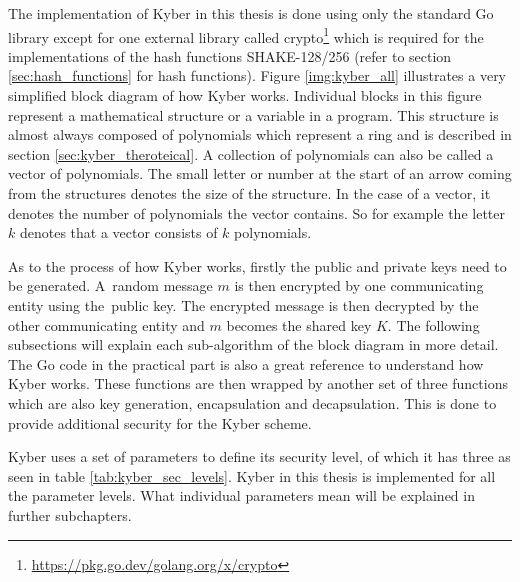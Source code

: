 The implementation of Kyber in this thesis is done using only the standard Go library except for one external library called crypto\footnote{\url{https://pkg.go.dev/golang.org/x/crypto}} which is required for the implementations of the hash functions SHAKE-128/256 (refer to section \ref{sec:hash_functions} for hash functions). Figure \ref{img:kyber_all} illustrates a very simplified block diagram of how Kyber works. Individual blocks in this figure represent a mathematical structure or a variable in a program. This structure is almost always composed of polynomials which represent a ring and is described in section \ref{sec:kyber_theroteical}. A collection of polynomials can also be called a vector of polynomials. The small letter or number at the start of an arrow coming from the structures denotes the size of the structure. In the case of a vector, it denotes the number of polynomials the vector contains. So for example the letter $k$ denotes that a vector consists of $k$ polynomials.

As to the process of how Kyber works, firstly the public and private keys need to be generated. A~random message $m$ is then encrypted by one communicating entity using the~public key. The encrypted message is then decrypted by the other communicating entity and $m$ becomes the shared key $K$. The following subsections will explain each sub-algorithm of the block diagram in more detail. The Go code in the practical part is also a great reference to understand how Kyber works. These functions are then wrapped by another set of three functions which are also key generation, encapsulation and decapsulation. This is done to provide additional security for the Kyber scheme.


Kyber uses a set of parameters to define its security level, of which it has three as seen in table \ref{tab:kyber_sec_levels}. Kyber in this thesis is implemented for all the parameter levels. What individual parameters mean will be explained in further subchapters.
